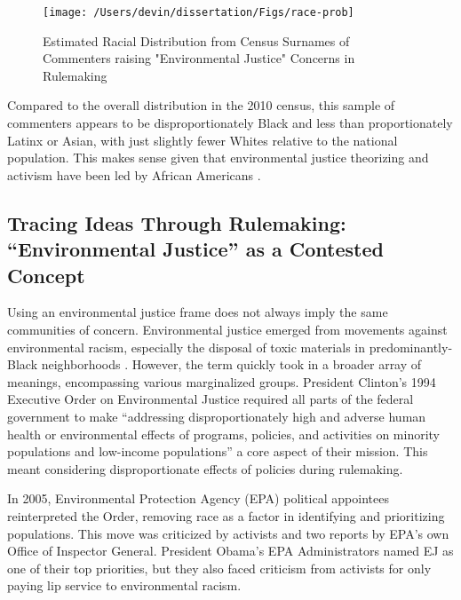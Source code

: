 \documentclass[
      12pt,
        ]{article}
\begin{document}
\begin{figure}

{\centering \texttt{[image: /Users/devin/dissertation/Figs/race-prob]} 

}

\caption{Estimated Racial Distribution from Census Surnames of Commenters raising "Environmental Justice" Concerns in Rulemaking}\label{fig:ejcommentsbyrace}
\end{figure}

Compared to the overall distribution in the 2010 census, this sample of commenters
appears to be disproportionately Black and less than proportionately
Latinx or Asian, with just slightly fewer Whites relative to the
national population. This makes sense given that environmental justice
theorizing and activism have been led by African Americans
\citep{Bullard1993}.

\hypertarget{tracing-ideas-through-rulemaking-environmental-justice-as-a-contested-concept}{%
\subsection{Tracing Ideas Through Rulemaking: ``Environmental Justice'' as a Contested Concept}\label{tracing-ideas-through-rulemaking-environmental-justice-as-a-contested-concept}}

Using an environmental justice frame does not always imply the same
communities of concern. Environmental justice emerged from movements
against environmental racism, especially the disposal of toxic
materials in predominantly-Black neighborhoods \citep{Bullard1993}. However, the term
quickly took in a broader array of meanings, encompassing various marginalized groups. President Clinton's 1994 Executive Order on
Environmental Justice required all parts of the federal government
to make ``addressing disproportionately high and adverse human health or
environmental effects of programs, policies, and activities on minority
populations and low-income populations'' a core aspect of their mission.
This meant considering disproportionate effects of policies during rulemaking.

In 2005, Environmental Protection Agency (EPA) political appointees reinterpreted the Order, removing race as a factor in identifying and prioritizing populations. This move was criticized by activists and two reports by EPA's own Office of Inspector General. President Obama's EPA Administrators named EJ as one of their top priorities, but they also faced criticism from activists for only paying lip service to environmental racism.
\end{document}
